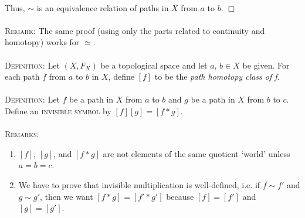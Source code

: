 \documentclass[12pt]{article}
\begin{document}
\\Thus, $\sim$ is an equivalence relation of paths in $X$ from $a$ to $b$. $\Box$
\\ \\\textsc{Remark:} The same proof (using only the parts related to continuity and homotopy) works for $\simeq$.
\\ \\\textsc{Definition:} Let $(X, F_X)$ be a topological space and let $a$, $b \in X$ be given. For each path $f$ from $a$ to $b$ in $X$, define $[f]$ to be the \textit{path homotopy class of f}.
\\ \\\textsc{Definition:} Let $f$ be a path in $X$ from $a$ to $b$ and $g$ be a path in $X$ from $b$ to $c$. Define an \textsc{invisible symbol} by $[f][g] = [f \ast g]$.
\\ \\\textsc{Remarks:}
\begin{enumerate} 
\item  $[f]$, $[g]$, and $[f \ast g]$ are not elements of the same quotient `world' unless $a = b = c$.
\item We have to prove that invisible multiplication is well-defined, i.e. if $f \sim f'$ and $g \sim g'$, then we want $[f \ast g] = [f' \ast g']$ because $[f] = [f']$ and $[g] = [g']$.
\end{enumerate}
\end{document}
